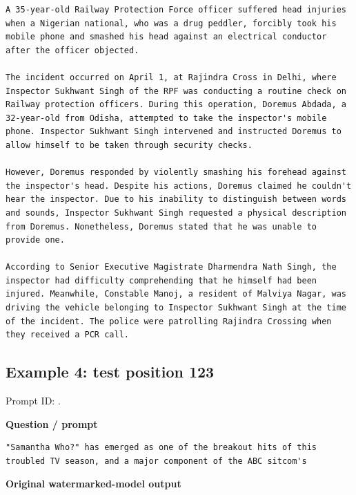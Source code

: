 \begin{Verbatim}
A 35-year-old Railway Protection Force officer suffered head injuries when a Nigerian national, who was a drug peddler, forcibly took his mobile phone and smashed his head against an electrical conductor after the officer objected.

The incident occurred on April 1, at Rajindra Cross in Delhi, where Inspector Sukhwant Singh of the RPF was conducting a routine check on Railway protection officers. During this operation, Doremus Abdada, a 32-year-old from Odisha, attempted to take the inspector's mobile phone. Inspector Sukhwant Singh intervened and instructed Doremus to allow himself to be taken through security checks.

However, Doremus responded by violently smashing his forehead against the inspector's head. Despite his actions, Doremus claimed he couldn't hear the inspector. Due to his inability to distinguish between words and sounds, Inspector Sukhwant Singh requested a physical description from Doremus. Nonetheless, Doremus stated that he was unable to provide one.

According to Senior Executive Magistrate Dharmendra Nath Singh, the inspector had difficulty comprehending that he himself had been injured. Meanwhile, Constable Manoj, a resident of Malviya Nagar, was driving the vehicle belonging to Inspector Sukhwant Singh at the time of the incident. The police were patrolling Rajindra Crossing when they received a PCR call.
\end{Verbatim}

\subsection{Example 4: test position
123}\label{record-docs-watermarking-qualitative-paper-sir-vanilla-md-example-4-test-position-123}

Prompt ID:
\texttt{}.

\textbf{Question / prompt}

\begin{Verbatim}
"Samantha Who?" has emerged as one of the breakout hits of this troubled TV season, and a major component of the ABC sitcom's
\end{Verbatim}

\textbf{Original watermarked-model output}

